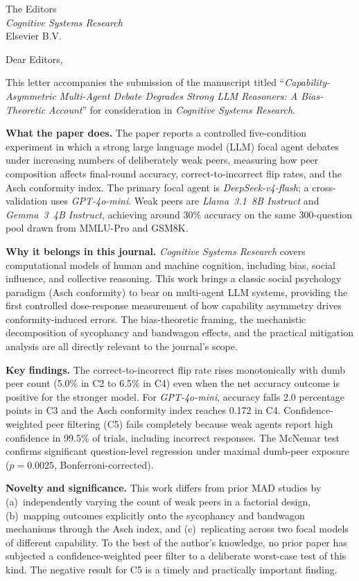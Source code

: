\documentclass[12pt,a4paper]{letter}
\begin{document}
\begin{letter}{%
  The Editors\\
  \textit{Cognitive Systems Research}\\
  Elsevier B.V.}

\opening{Dear Editors,}

This letter accompanies the submission of the manuscript titled
``\textit{Capability-Asymmetric Multi-Agent Debate Degrades Strong LLM
Reasoners: A Bias-Theoretic Account}'' for consideration in
\textit{Cognitive Systems Research}.

\textbf{What the paper does.}
The paper reports a controlled five-condition experiment in which a strong
large language model (LLM) focal agent debates under increasing numbers of
deliberately weak peers, measuring how peer composition affects final-round
accuracy, correct-to-incorrect flip rates, and the Asch conformity index.
The primary focal agent is \textit{DeepSeek-v4-flash}; a cross-validation
uses \textit{GPT-4o-mini}. Weak peers are \textit{Llama~3.1~8B Instruct}
and \textit{Gemma~3~4B Instruct}, achieving around 30\% accuracy on the
same 300-question pool drawn from MMLU-Pro and GSM8K.

\textbf{Why it belongs in this journal.}
\textit{Cognitive Systems Research} covers computational models of human and
machine cognition, including bias, social influence, and collective
reasoning.
This work brings a classic social psychology paradigm (Asch conformity) to
bear on multi-agent LLM systems, providing the first controlled dose-response
measurement of how capability asymmetry drives conformity-induced errors.
The bias-theoretic framing, the mechanistic decomposition of sycophancy and
bandwagon effects, and the practical mitigation analysis are all directly
relevant to the journal's scope.

\textbf{Key findings.}
The correct-to-incorrect flip rate rises monotonically with dumb peer count
(5.0\% in C2 to 6.5\% in C4) even when the net accuracy outcome is positive
for the stronger model.
For \textit{GPT-4o-mini}, accuracy falls 2.0 percentage points in C3 and
the Asch conformity index reaches 0.172 in C4.
Confidence-weighted peer filtering (C5) fails completely because weak agents
report high confidence in 99.5\% of trials, including incorrect responses.
The McNemar test confirms significant question-level regression under maximal
dumb-peer exposure ($p = 0.0025$, Bonferroni-corrected).

\textbf{Novelty and significance.}
This work differs from prior MAD studies by (a)~independently varying the
count of weak peers in a factorial design, (b)~mapping outcomes explicitly
onto the sycophancy and bandwagon mechanisms through the Asch index, and
(c)~replicating across two focal models of different capability.
To the best of the author's knowledge, no prior paper has subjected a
confidence-weighted peer filter to a deliberate worst-case test of this kind.
The negative result for C5 is a timely and practically important finding.


\end{letter}
\end{document}
